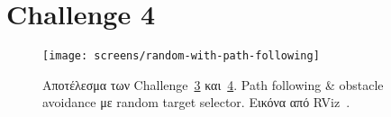 \section{Challenge 4}\label{section:ex4}

\begin{figure}
    \centering
    \texttt{[image: screens/random-with-path-following]}
    \caption{Αποτέλεσμα των Challenge~\hyperref[section:ex3]{3} και~\hyperref[section:ex4]{4}. Path following \& obstacle avoidance με random target selector. Εικόνα από RViz~\protect\cite{rviz}.}
    \label{fig:random-with-path-following}
\end{figure}
